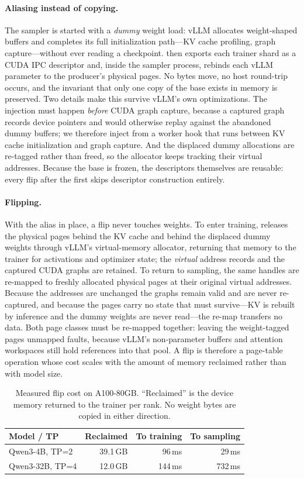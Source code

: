 \paragraph{Aliasing instead of copying.} The sampler is started with a \emph{dummy}
weight load: vLLM allocates weight-shaped buffers and completes its full initialization
path---KV cache profiling, graph capture---without ever reading a checkpoint. \sysname
then exports each trainer shard as a CUDA IPC descriptor and, inside the sampler
process, rebinds each vLLM parameter to the producer's physical pages. No bytes move,
no host round-trip occurs, and the invariant that only one copy of the base exists in
memory is preserved. Two details make this survive vLLM's own optimizations. The
injection must happen \emph{before} CUDA graph capture, because a captured graph records
device pointers and would otherwise replay against the abandoned dummy buffers; we
therefore inject from a worker hook that runs between KV cache initialization and graph
capture. And the displaced dummy allocations are re-tagged rather than freed, so the
allocator keeps tracking their virtual addresses. Because the base is frozen, the
descriptors themselves are reusable: every flip after the first skips descriptor
construction entirely.

\paragraph{Flipping.} With the alias in place, a flip never touches weights. To enter
training, \sysname releases the physical pages behind the KV cache and behind the
displaced dummy weights through vLLM's virtual-memory allocator, returning that memory
to the trainer for activations and optimizer state; the \emph{virtual} address records
and the captured CUDA graphs are retained. To return to sampling, the same handles are
re-mapped to freshly allocated physical pages at their original virtual addresses.
Because the addresses are unchanged the graphs remain valid and are never re-captured,
and because the pages carry no state that must survive---KV is rebuilt by inference and
the dummy weights are never read---the re-map transfers no data. Both page classes must
be re-mapped together: leaving the weight-tagged pages unmapped faults, because vLLM's
non-parameter buffers and attention workspaces still hold references into that pool. A
flip is therefore a page-table operation whose cost scales with the amount of memory
reclaimed rather than with model size.

\begin{table}[t]
\centering
\small
\caption{Measured flip cost on A100-80GB. ``Reclaimed'' is the device memory returned
to the trainer per rank. No weight bytes are copied in either direction.}
\label{tab:flipcost}
\begin{tabular}{lrrr}
\toprule
Model / TP & Reclaimed & To training & To sampling \\
\midrule
Qwen3-4B, TP=2  & 39.1\,GB & 96\,ms  & 29\,ms  \\
Qwen3-32B, TP=4 & 12.0\,GB & 144\,ms & 732\,ms \\
\bottomrule
\end{tabular}
\end{table}


